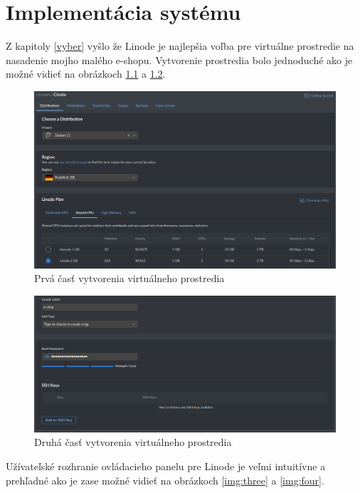 \chapter{Implementácia systému}

Z kapitoly \ref{vyber} vyšlo že Linode je najlepšia voľba pre virtuálne prostredie na nasadenie mojho malého e-shopu. Vytvorenie prostredia bolo jednoduché ako je možné vidieť na obrázkoch \ref{img:one} a \ref{img:two}.

\begin{figure}[ht!]
  \includegraphics[width=\linewidth]{images/1.png}
  \caption{Prvá časť vytvorenia virtuálneho prostredia}
  \label{img:one}
\end{figure}

\begin{figure}[ht!]
  \includegraphics[width=\linewidth]{images/2.png}
  \caption{Druhá časť vytvorenia virtuálneho prostredia}
  \label{img:two}
\end{figure}

\noindent Užívateľské rozhranie ovládacieho panelu pre Linode je veľmi intuitívne a prehľadné ako je zase možné vidieť na obrázkoch \ref{img:three} a \ref{img:four}.

